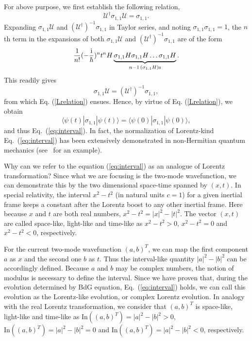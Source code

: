 \documentclass[pra,epsfig,rotate,superscriptaddress,showpacs]{revtex4}
\begin{document}
For above purpose, we first establish the following relation,
\begin{equation} \label{Lrelation}
\mathcal{U}^\dag\sigma_{1,1}\mathcal{U}=\sigma_{1,1}.
\end{equation}
Expanding $\sigma_{1,1}\mathcal{U}$ and $(\mathcal{U}^\dag)^{-1}\sigma_{1,1}$ in Taylor series, and noting $\sigma_{1,1}\sigma_{1,1}=1$, the $n$th term in the expansions of both $\sigma_{1,1}\mathcal{U}$ and $(\mathcal{U}^\dag)^{-1}\sigma_{1,1}$ are of the form
\begin{equation}
\frac{1}{n!}(-\frac{{\text i}}{\hbar})^n t^n H \underbrace{\sigma_{1,1}H\sigma_{1,1}H\ldots\sigma_{1,1}H}_{n-1 \,(\sigma_{1,1}H){\text s}}.
\end{equation}
This readily gives
\begin{equation}
\sigma_{1,1}\mathcal{U}=(\mathcal{U}^\dag)^{-1}\sigma_{1,1},
\end{equation}
from which Eq. (\ref{Lrelation}) ensues. Hence, by virtue of Eq. (\ref{Lrelation}), we obtain
\begin{equation} \label{L1}
\langle\psi(t)|\sigma_{1,1}|\psi(t)\rangle=\langle\psi(0)|\sigma_{1,1}|\psi(0)\rangle,
\end{equation}
and thus Eq.~(\ref{eq:interval}). In fact, the normalization of Lorentz-kind Eq.~(\ref{eq:interval}) has been extensively demonstrated in non-Hermitian quantum mechanics (see~\cite{Gong2} for an example).

Why can we refer to the equation (\ref{eq:interval}) as an analogue of Lorentz transformation? Since what we are focusing is the two-mode wavefunction, we can demonstrate this by the two dimensional space-time spanned by $(x,t)$. In special relativity, the interval $x^2-t^2$ (in natural units $c=1$) for a given inertial frame keeps a constant after the Lorentz boost to any other inertial frame. Here because $x$ and $t$ are both real numbers, $x^2-t^2=|x|^2-|t|^2$. The vector $(x,t)$ are called space-like, light-like and time-like as $x^2-t^2>0$, $x^2-t^2=0$ and $x^2-t^2<0$, respectively.

For the current two-mode wavefunction $(a,b)^T$, we can map the first component $a$ as $x$ and the second one $b$ as $t$. Thus the interval-like quantity $|a|^2-|b|^2$ can be accordingly defined. Because $a$ and $b$ may be complex numbers, the notion of modulus is necessary to define the interval. Since we have proven that, during the evolution determined by BdG equation, Eq.~(\ref{eq:interval}) holds, we can call this evolution as the Lorentz-like evolution, or complex Lorentz evolution. In analogy with the real Lorentz transformation, we consider that $(a,b)^T$ is space-like, light-like and time-like as ${\text {In}}((a,b)^T)=|a|^2-|b|^2>0$, ${\text {In}}((a,b)^T)=|a|^2-|b|^2=0$ and ${\text {In}}((a,b)^T)=|a|^2-|b|^2<0$, respectively.
\end{document}
